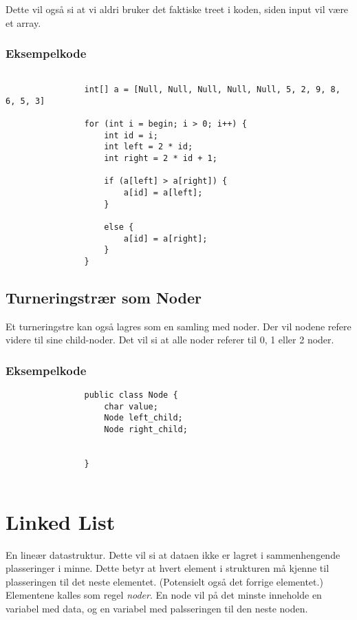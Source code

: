 \documentclass[11pt]{article}
\begin{document}
Dette vil også si at vi aldri bruker det faktiske treet i koden, siden input vil være et array. \\

\subsubsection{Eksempelkode}

\begin{lstlisting}
				
				int[] a = [Null, Null, Null, Null, Null, 5, 2, 9, 8, 6, 5, 3]

				for (int i = begin; i > 0; i++) {
					int id = i;
					int left = 2 * id;
					int right = 2 * id + 1;

					if (a[left] > a[right]) {
						a[id] = a[left];
					}

					else {
						a[id] = a[right];
					}
				}

			\end{lstlisting}
\subsection{Turneringstrær som Noder}

Et turneringstre kan også lagres som en samling med noder.
Der vil nodene refere videre til sine child-noder. Det vil si at alle noder
referer til 0, 1 eller 2 noder.

\subsubsection{Eksempelkode}
\begin{lstlisting}
				public class Node {
					char value;
					Node left_child;
					Node right_child;

					
				}	
			
			\end{lstlisting}

\newpage
\section{Linked List}
En lineær datastruktur. Dette vil si at dataen ikke er lagret i sammenhengende
plasseringer i minne. Dette betyr at hvert element i strukturen må kjenne til plasseringen til det neste elementet.
(Potensielt også det forrige elementet.) \\

Elementene kalles som regel \textit{noder}. En node vil på det minste inneholde en variabel
med data, og en variabel med palsseringen til den neste noden. \\ \\
\end{document}
